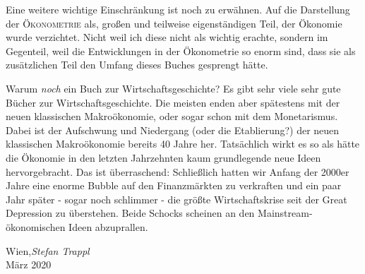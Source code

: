 Eine weitere wichtige Einschränkung ist noch zu erwähnen. Auf die Darstellung der \textsc{Ökonometrie} als, großen und teilweise eigenständigen Teil, der Ökonomie wurde verzichtet. Nicht weil ich diese nicht als wichtig erachte, sondern im Gegenteil, weil die Entwicklungen in der Ökonometrie so enorm sind, dass sie als zusätzlichen Teil den Umfang dieses Buches gesprengt hätte.

Warum \textit{noch} ein Buch zur Wirtschaftsgeschichte? Es gibt sehr viele sehr gute Bücher zur Wirtschaftsgeschichte. Die meisten enden aber spätestens mit der neuen klassischen Makroökonomie, oder sogar schon mit dem Monetarismus. Dabei ist der Aufschwung und Niedergang (oder die Etablierung?) der neuen klassischen Makroökonomie bereits 40 Jahre her. Tatsächlich wirkt es so als hätte die Ökonomie in den letzten Jahrzehnten kaum grundlegende neue Ideen hervorgebracht. Das ist überraschend: Schließlich hatten wir Anfang der 2000er Jahre eine enorme Bubble auf den Finanzmärkten zu verkraften und ein paar Jahr später - sogar noch schlimmer - die größte Wirtschaftskrise seit der Great Depression zu überstehen. Beide Schocks scheinen an den Mainstream-ökonomischen Ideen abzuprallen.


\vspace{1cm}
\begin{flushright}\noindent
Wien,\hfill {\it Stefan Trappl}\\
März 2020\hfill
\end{flushright}


